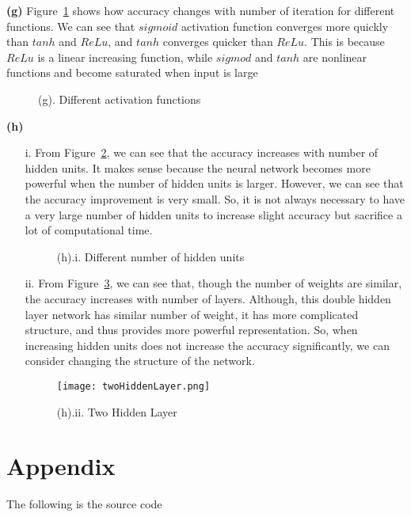 \documentclass[12pt]{article} %
\theoremstyle{definition}\newtheorem{law}{Law}
\theoremstyle{plain}\newtheorem{jury}[law]{Jury}
\theoremstyle{remark}\newtheorem{juu}{Juu}
\theoremstyle{definition}\newtheorem{kuu}[law]{Kuu}
\theoremstyle{definition}\newtheorem{muu}{Muu}[section]
\theoremstyle{definition}\newtheorem{honoluu}{Honoluu}[section]
\theoremstyle{definition}\newtheorem{konoluu}[muu]{Konoluu}
\begin{document}
{\bf (g)}
Figure~\ref{fig:fun} shows how accuracy changes with number of iteration for different functions. We can see that $sigmoid$ activation function converges more quickly than $tanh$ and $ReLu$, and $tanh$ converges quicker than $ReLu$. This is because $ReLu$ is a linear increasing function, while $sigmod$ and $tanh$ are nonlinear functions and become saturated when input is large 
\begin{figure}[h!]
\centering
{}
\quad
{}
\quad
{}
\caption{(g). Different activation functions}
\label{fig:fun}
\end{figure}

{\bf (h)}
\begin{enumerate}
\item[i.]
From Figure~\ref{fig:numhidden}, we can see that the accuracy increases with number of hidden units. It makes sense because the neural network becomes more powerful when the number of hidden units is larger. However, we can see that the accuracy improvement is very small. So, it is not always necessary to have a very large number of hidden units to increase slight accuracy but sacrifice a lot of computational time.

\begin{figure}[h!]
\centering
{}
\quad
{}
\caption{(h).i. Different number of hidden units}
\label{fig:numhidden}
\end{figure}

\item[ii.]
From Figure~\ref{fig:twolayer}, we can see that, though the number of weights are similar, the accuracy increases with number of layers. Although, this double hidden layer network has similar number of weight, it has more complicated structure, and thus provides more powerful representation. So, when increasing hidden units does not increase the accuracy significantly, we can consider changing the structure of the network.
\begin{figure}[h!]
\centering
\texttt{[image: twoHiddenLayer.png]}
\caption{(h).ii. Two Hidden Layer }
\label{fig:twolayer}
\end{figure} 
\end{enumerate}


\newpage
\newpage

\section{Appendix}
The following is the  source code\\




\end{document}
